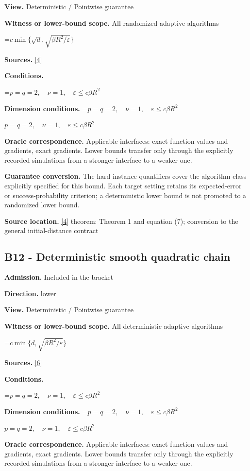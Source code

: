 \documentclass[10pt,a4paper]{article}
\newcommand{\AtlasMath}[1]{\par\begingroup\centering\setbox0=\hbox{$\displaystyle #1$}\ifdim\wd0>1.4\linewidth\typeout{ATLAS WIDE FORMULA: \the\wd0}\fi\ifdim\wd0>\linewidth\resizebox{\linewidth}{!}{\box0}\else\box0\fi\par\endgroup}
\newcommand{\AtlasInlineMath}[1]{\begingroup\setbox0=\hbox{$#1$}\ifdim\wd0>.4\linewidth\endgroup\AtlasMath{#1}\else\endgroup$#1$\fi}
\begin{document}
\textbf{View.} Deterministic / Pointwise guarantee

\textbf{Witness or lower-bound scope.} All randomized adaptive algorithms

\AtlasMath{c\min\{\sqrt d,\sqrt{\beta R^2/\varepsilon}\}}
\textbf{Sources.} \href{https://arxiv.org/pdf/2609.10874}{[4]}

\textbf{Conditions.} 
\AtlasMath{p=q=2,\quad\nu=1,\quad\varepsilon\le c\beta R^2}


\textbf{Dimension conditions.} \AtlasInlineMath{p=q=2,\quad\nu=1,\quad\varepsilon\le c\beta R^2}

\textbf{Oracle correspondence.} Applicable interfaces: exact function values and gradients, exact gradients. Lower bounds transfer only through the explicitly recorded simulations from a stronger interface to a weaker one.

\textbf{Guarantee conversion.} The hard-instance quantifiers cover the algorithm class explicitly specified for this bound. Each target setting retains its expected-error or success-probability criterion; a deterministic lower bound is not promoted to a randomized lower bound.

\textbf{Source location.} \href{https://arxiv.org/pdf/2609.10874}{[4]} theorem: Theorem 1 and equation (7); conversion to the general initial-distance contract

\subsection{B12 - Deterministic smooth quadratic chain}
\textbf{Admission.} Included in the bracket

\textbf{Direction.} lower

\textbf{View.} Deterministic / Pointwise guarantee

\textbf{Witness or lower-bound scope.} All deterministic adaptive algorithms

\AtlasMath{c\min\{d,\sqrt{\beta R^2/\varepsilon}\}}
\textbf{Sources.} \href{https://arxiv.org/pdf/2101.09740v2}{[6]}

\textbf{Conditions.} 
\AtlasMath{p=q=2,\quad\nu=1,\quad\varepsilon\le c\beta R^2}


\textbf{Dimension conditions.} \AtlasInlineMath{p=q=2,\quad\nu=1,\quad\varepsilon\le c\beta R^2}

\textbf{Oracle correspondence.} Applicable interfaces: exact function values and gradients, exact gradients. Lower bounds transfer only through the explicitly recorded simulations from a stronger interface to a weaker one.
\end{document}
